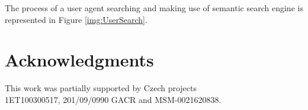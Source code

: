 \documentclass{www2009-submission}
\begin{document}
The process of a user agent searching and making use of semantic search engine is represented in Figure \ref{img:UserSearch}.





\section{Acknowledgments}
This work was partially supported by Czech projects\\1ET100300517, 201/09/0990 GACR and MSM-0021620838.

%



\balancecolumns %
\end{document}

